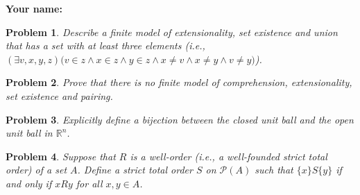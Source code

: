 \documentclass[12pt]{amsart}
\newtheorem{problem}{Problem}
\begin{document}
\begin{center}
\end{center}


\vspace{1em}

\noindent \textbf{Your name:}\\


\noindent\hrulefill

\vspace{-1.5em}

\noindent\hrulefill

\vspace{1em}




\begin{problem}
Describe a finite model of extensionality, set existence and union that has a set with at least three elements  (i.e., $(\exists v,x,y,z)\big(v \in z \wedge x \in z \wedge y \in z \wedge x \neq v \wedge x \neq y \wedge v \neq y\big)$).
\end{problem}



\begin{problem}
Prove that there is no finite model of comprehension, extensionality, set existence and pairing.
\end{problem}



\begin{problem}
Explicitly define a bijection between the closed unit ball and the open unit ball in $\mathbb R^n$.
\end{problem}



\begin{problem}
Suppose that $R$ is a well-order (i.e., a well-founded strict total order) of a set $A$.  Define a strict total order $S$ on $\mathscr P(A)$ such that $\{x\}S\{y\}$ if and only if $xRy$ for all $x,y \in A$.
\end{problem}
\end{document}
